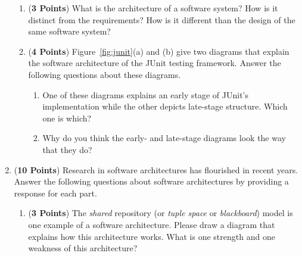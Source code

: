 \documentclass[12pt,epsf,psfig,graphicx]{article}
\begin{document}
\begin{enumerate}
\begin{enumerate}
\item ({\bf 3 Points}) What is the architecture of a software system? How is it distinct from the requirements? How is
	it different than the design of the same software system? 

\item ({\bf 4 Points}) Figure~\ref{fig:junit}(a) and (b) give two diagrams that explain the software
	architecture of the JUnit testing framework.  Answer the following questions about these diagrams.

	\begin{enumerate}
		\item One of these diagrams explains an early stage of JUnit's implementation while the other depicts late-stage
			structure.  Which one is which?

		\item Why do you think the early- and late-stage diagrams look the way that they do?
	\end{enumerate}

% 

% 
\end{enumerate}

\newpage

\item ({\bf 10 Points}) Research in software architectures has
  flourished in recent years.  Answer the following questions about
  software architectures by providing a response for each part.

\begin{enumerate}

% 
\item ({\bf 3 Points}) The {\em shared} repository (or {\em tuple
  space} or {\em blackboard}) model is one example of a software
  architecture.  Please draw a diagram that explains how this
  architecture works.  What is one strength and one weakness of this
  architecture?


\end{enumerate}
\end{enumerate}
\end{document}

